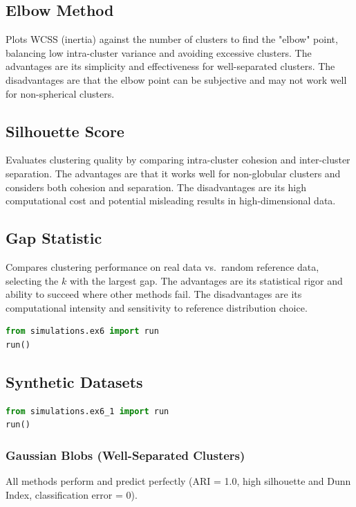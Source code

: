 \documentclass[11pt,a4paper]{article}
\begin{document}
\subsection{Elbow Method}
Plots WCSS (inertia) against the number of clusters to find the "elbow" point, balancing low intra-cluster variance and avoiding excessive clusters. The advantages are its simplicity and effectiveness for well-separated clusters. The disadvantages are that the elbow point can be subjective and may not work well for non-spherical clusters.

\subsection{Silhouette Score}
Evaluates clustering quality by comparing intra-cluster cohesion and inter-cluster separation. The advantages are that it works well for non-globular clusters and considers both cohesion and separation. The disadvantages are its high computational cost and potential misleading results in high-dimensional data.

\subsection{Gap Statistic}
Compares clustering performance on real data vs.\ random reference data, selecting the $k$ with the largest gap. The advantages are its statistical rigor and ability to succeed where other methods fail. The disadvantages are its computational intensity and sensitivity to reference distribution choice.

\begin{lstlisting}[language=Python]
from simulations.ex6 import run
run()
\end{lstlisting}

\subsection{Synthetic Datasets}

\begin{lstlisting}[language=Python]
from simulations.ex6_1 import run
run()
\end{lstlisting}

\subsubsection*{Gaussian Blobs (Well-Separated Clusters)}
All methods perform and predict perfectly (ARI = 1.0, high silhouette and Dunn Index, classification error = 0).
\end{document}
